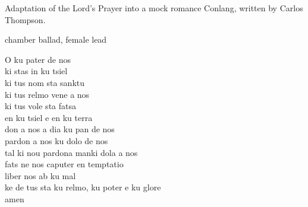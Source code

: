 
\begin{notes}
Adaptation of the Lord's Prayer into a mock romance Conlang, written by Carlos Thompson.
\end{notes}
\begin{style}
chamber ballad, female lead
\end{style}
\begin{lyrics}
O ku pater de nos\\
ki stas in ku tsiel\\
ki tus nom sta sanktu\\
ki tus relmo vene a nos\\
ki tus vole sta fatsa\\
en ku tsiel e en ku terra\\
don a nos a dia ku pan de nos\\
pardon a nos ku dolo de nos\\
tal ki nou pardona manki dola a nos\\
fats ne nos caputer en temptatio\\
liber nos ab ku mal\\
ke de tus sta ku relmo, ku poter e ku glore\\
amen
\end{lyrics}

